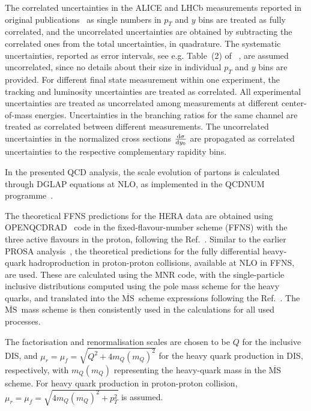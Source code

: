 \documentclass[12pt]{article}
\newcommand{\msbar}{$\overline{\text{MS}}\, $\xspace}
\begin{document}
The correlated uncertainties in the ALICE and LHCb measurements reported in original publications~\cite{Aaij:2016jht, Aaij:2013mga, Aaij:2015bpa, Acharya:2019mgn, Acharya:2017jgo, Aaij:2013noa} as single numbers in $p_T$ and $y$ bins 
are treated as fully correlated, and the uncorrelated uncertainties are obtained by subtracting the correlated ones from the 
total uncertainties, in quadrature. The systematic uncertainties, reported as error intervals, see e.g. Table~(2) of ~\cite{Aaij:2016jht}, are assumed uncorrelated, since no details about their size in individual $p_T$ and $y$ bins are provided. For different final state measurement within one experiment, the tracking and luminosity uncertainties are treated as correlated. All experimental uncertainties are treated as uncorrelated among measurements at different center-of-mass energies. Uncertainties in the branching ratios for the same channel are treated as correlated between different measurements. The uncorrelated uncertainties in the normalized cross sections $\frac{{\rm d}\sigma}{{\rm d}y_0}$ are propagated as correlated uncertainties to the respective complementary rapidity bins.

In the presented QCD analysis, the scale evolution of partons is calculated through DGLAP equations at NLO, as implemented in 
the QCDNUM programme~\cite{openqcdrad}.  

The theoretical FFNS predictions for the HERA data are obtained using OPENQCDRAD~\cite{openqcdrad} code in the 
fixed-flavour-number scheme (FFNS) with the three active flavours in the proton, following the Ref.~\cite{H1:2018flt}. 
Similar to the earlier PROSA analysis~\cite{Zenaiev:2015rfa}, the theoretical predictions for the fully differential 
heavy-quark hadroproduction in proton-proton collisions, available at NLO in FFNS, are used. These are calculated using 
the MNR code, with the single-particle inclusive distributions computed using the pole mass scheme for the heavy quarks, 
and translated into the \msbar scheme expressions following the Ref.~\cite{Dowling:2013baa}. The \msbar mass scheme is 
then consistently used in the calculations for all used processes.

The factorisation and renormalisation scales are chosen to be $Q$ for the inclusive DIS, and $\mu_r = \mu_f = \sqrt{Q^2 + 4m_Q(m_Q)^2}$ for the heavy quark production in DIS, respectively, with $m_Q(m_Q)$ representing the heavy-quark mass in the \msbar scheme. 
For heavy quark production in proton-proton collision, $\mu_r = \mu_f = \sqrt{4m_Q(m_Q)^2+p_T^2}$ is assumed. 
\end{document}
